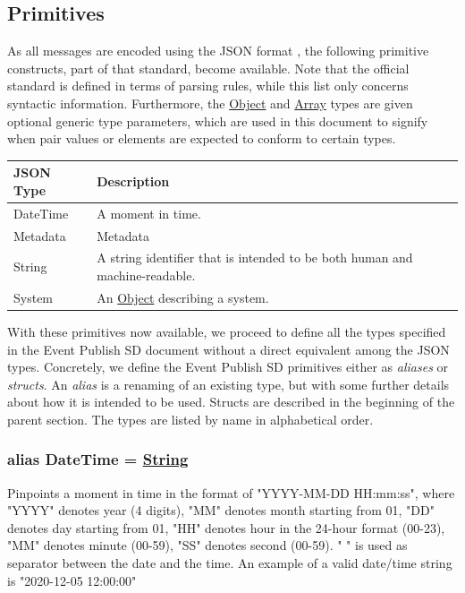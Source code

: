 \documentclass[a4paper]{arrowhead}
\newcommand{\pdef}[1]{{\textcolor{ArrowheadGrey}{#1 \label{sec:model:primitives:#1} \label{sec:model:primitives:#1s}}}}
\newcommand{\pref}[1]{{\textcolor{ArrowheadGrey}{\hyperref[sec:model:primitives:#1]{#1}}}}
\begin{document}
\subsection{Primitives}
\label{sec:model:primitives}

As all messages are encoded using the JSON format \cite{bray2014json}, the following primitive constructs, part of that standard, become available.
Note that the official standard is defined in terms of parsing rules, while this list only concerns syntactic information.
Furthermore, the \pref{Object} and \pref{Array} types are given optional generic type parameters, which are used in this document to signify when pair values or elements are expected to conform to certain types. 

\begin{table}[ht!]
\begin{tabularx}{\textwidth}{| p{3cm} | X |} \hline
\rowcolor{gray!33} JSON Type & Description \\ \hline
\pdef{DateTime}        & A moment in time.  \\ \hline
\pdef{Metadata}        & Metadata \\ \hline 
\pdef{String}             & A string identifier that is intended to be both human and machine-readable. \\ \hline
\pdef{System}           & An \pref{Object} describing a system. \\ \hline
\end{tabularx}
\end{table}

With these primitives now available, we proceed to define all the types specified in the Event Publish SD document without a direct equivalent among the JSON types.
Concretely, we define the Event Publish SD primitives either as \textit{aliases} or \textit{structs}.
An \textit{alias} is a renaming of an existing type, but with some further details about how it is intended to be used.
Structs are described in the beginning of the parent section.
The types are listed by name in alphabetical order.

\subsubsection{alias \pdef{DateTime} = \pref{String}}

Pinpoints a moment in time in the format of "YYYY-MM-DD HH:mm:ss", where "YYYY" denotes year (4 digits), "MM" denotes month starting from 01, "DD" denotes day starting from 01, "HH" denotes hour in the 24-hour format (00-23), "MM" denotes minute (00-59), "SS" denotes second (00-59). " " is used as separator between the date and the time.
An example of a valid date/time string is "2020-12-05 12:00:00"
\end{document}
